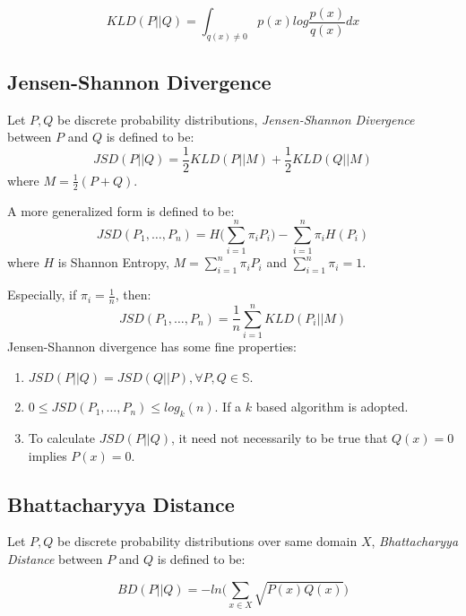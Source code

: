 \documentclass[10pt,conference,letterpaper]{article}
\begin{document}
			\begin{equation}
				KLD(P||Q) = \int_{q(x) \ne 0} p(x)log\frac{p(x)}{q(x)}dx
			\end{equation}
	
		\subsection{Jensen-Shannon Divergence}
			Let $P,Q$ be discrete probability distributions, \textit{Jensen-Shannon Divergence} between $P$ and $Q$ is defined to be:
			\begin{equation}
				JSD(P||Q) = \frac{1}{2}KLD(P||M) + \frac{1}{2}KLD(Q||M)
			\end{equation}
			where $\displaystyle M = \frac{1}{2}(P+Q)$.
			
			A more generalized form is defined to be:
			\begin{equation}
				JSD(P_1, \dots, P_n) = H\Big(\sum_{i=1}^n\pi_i P_i\Big) - \sum_{i=1}^n\pi_iH(P_i)
			\end{equation}
			where $H$ is Shannon Entropy, $\displaystyle M = \sum_{i=1}^{n}\pi_iP_i$ and $\displaystyle \sum_{i=1}^{n}\pi_i = 1$.
			
			Especially, if $\displaystyle \pi_i = \frac{1}{n}$, then:
			\begin{equation}
				JSD(P_1, \dots, P_n) = \frac{1}{n}\sum_{i=1}^{n}KLD(P_i||M)
			\end{equation}
			Jensen-Shannon divergence has some fine properties:
			\begin{enumerate}
				\item $JSD(P||Q) = JSD(Q||P), \forall P, Q\in \mathbb{S}$.
				\item $0 \le JSD(P_1, \dots, P_n) \le log_k(n)$. If a $k$ based algorithm is adopted.
				\item To calculate $JSD(P||Q)$, it need not necessarily to be true that $Q(x)=0$ implies $P(x)=0$.
			\end{enumerate}
		
		\subsection{Bhattacharyya Distance}
			Let $P,Q$ be discrete probability distributions over same domain $X$, \textit{Bhattacharyya Distance} between $P$ and $Q$ is defined to be:
		
			\begin{equation}
				BD(P||Q) = -ln\Big(\sum_{x\in X}\sqrt{P(x)Q(x)}\Big)
			\end{equation}
			
\end{document}
